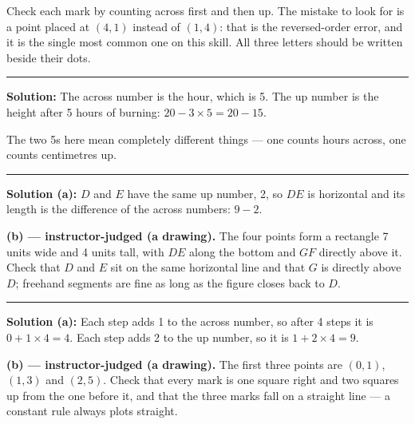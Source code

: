 \documentclass[12pt]{article}
\begin{document}
Check each mark by counting across first and then up. The mistake to look for is a point placed at $(4, 1)$ instead of $(1, 4)$: that is the reversed-order error, and it is the single most common one on this skill. All three letters should be written beside their dots.

\vspace{0.15cm}\noindent\rule{\linewidth}{0.2pt}\vspace{0.15cm}


\textbf{Solution:} The across number is the hour, which is 5. The up number is the height after 5 hours of burning: $20 - 3 \times 5 = 20 - 15$. 

The two 5s here mean completely different things --- one counts hours across, one counts centimetres up.

\vspace{0.15cm}\noindent\rule{\linewidth}{0.2pt}\vspace{0.15cm}


\textbf{Solution (a):} $D$ and $E$ have the same up number, 2, so $DE$ is horizontal and its length is the difference of the across numbers: $9 - 2$. 

\textbf{(b) --- instructor-judged (a drawing).} The four points form a rectangle 7 units wide and 4 units tall, with $DE$ along the bottom and $GF$ directly above it. Check that $D$ and $E$ sit on the same horizontal line and that $G$ is directly above $D$; freehand segments are fine as long as the figure closes back to $D$.

\vspace{0.15cm}\noindent\rule{\linewidth}{0.2pt}\vspace{0.15cm}


\textbf{Solution (a):} Each step adds 1 to the across number, so after 4 steps it is $0 + 1 \times 4 = 4$. Each step adds 2 to the up number, so it is $1 + 2 \times 4 = 9$. 

\textbf{(b) --- instructor-judged (a drawing).} The first three points are $(0, 1)$, $(1, 3)$ and $(2, 5)$. Check that every mark is one square right and two squares up from the one before it, and that the three marks fall on a straight line --- a constant rule always plots straight.
\end{document}
